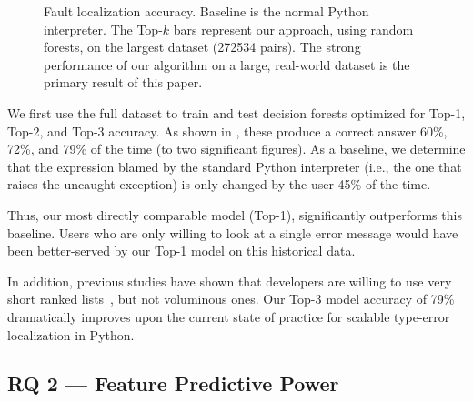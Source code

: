 \documentclass[conference]{IEEEtran}
\begin{document}
\begin{figure}
\caption{Fault localization accuracy.
Baseline is the normal Python interpreter. The Top-$k$ bars represent
our approach, using random forests,
on the largest dataset (272534 pairs). The strong performance of our
algorithm on a large, real-world dataset is the primary result of this paper. 
}
\label{fig-full-dataset-acc-random-forest}
\end{figure}

We first use the full dataset to train and test decision forests optimized for
Top-1, Top-2, and Top-3 accuracy. As shown in ,
these produce a correct answer 60\%, 72\%, and
79\% of the time (to two significant figures). As a baseline, we determine that
the expression blamed by the standard Python interpreter (i.e., the one that
raises the uncaught exception) is only changed by the user 45\% of the
time. 

Thus, our most directly comparable model (Top-1), significantly outperforms
this baseline. Users who are only willing to look at a single error message
would have been better-served by our Top-1 model on this historical data. 

In addition, previous studies have shown that developers are willing to use
very short ranked lists~\cite[Sec.~5.6]{orso-parnin}, but not voluminous
ones. Our Top-3 model accuracy of 79\% dramatically improves upon the
current state of practice for scalable type-error localization in Python. 


\subsection{RQ 2 --- Feature Predictive Power}
\end{document}
